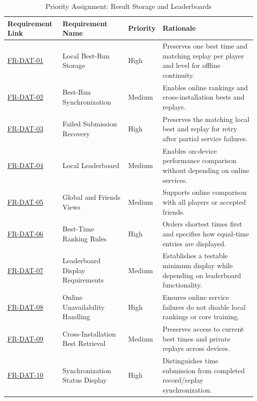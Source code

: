 \documentclass[12pt]{article}
\begin{document}
\begin{table}[htbp]
\centering
\small
\caption{Priority Assignment: Result Storage and Leaderboards}
\label{tab:priority-leaderboard}
\begin{tabular}{p{2.1cm} p{2.7cm} p{1.3cm} p{7.0cm}}
\hline
\textbf{Requirement Link} & \textbf{Requirement Name} & \textbf{Priority} & \textbf{Rationale} \\
\hline
\hyperref[sec:s2-leaderboard]{FR-DAT-01} & Local Best-Run Storage & High & Preserves one best time and matching replay per player and level for offline continuity. \\
\hyperref[sec:s2-leaderboard]{FR-DAT-02} & Best-Run Synchronization & Medium & Enables online rankings and cross-installation bests and replays. \\
\hyperref[sec:s2-leaderboard]{FR-DAT-03} & Failed Submission Recovery & High & Preserves the matching local best and replay for retry after partial service failures. \\
\hyperref[sec:s2-leaderboard]{FR-DAT-04} & Local Leaderboard & Medium & Enables on-device performance comparison without depending on online services. \\
\hyperref[sec:s2-leaderboard]{FR-DAT-05} & Global and Friends Views & Medium & Supports online comparison with all players or accepted friends. \\
\hyperref[sec:s2-leaderboard]{FR-DAT-06} & Best-Time Ranking Rules & High & Orders shortest times first and specifies how equal-time entries are displayed. \\
\hyperref[sec:s2-leaderboard]{FR-DAT-07} & Leaderboard Display Requirements & Medium & Establishes a testable minimum display while depending on leaderboard functionality. \\
\hyperref[sec:s2-leaderboard]{FR-DAT-08} & Online Unavailability Handling & High & Ensures online service failures do not disable local rankings or core training. \\
\hyperref[sec:s2-leaderboard]{FR-DAT-09} & Cross-Installation Best Retrieval & Medium & Preserves access to current best times and private replays across devices. \\
\hyperref[sec:s2-leaderboard]{FR-DAT-10} & Synchronization Status Display & High & Distinguishes time submission from completed record/replay synchronization. \\
\hline
\end{tabular}
\end{table}
\end{document}
